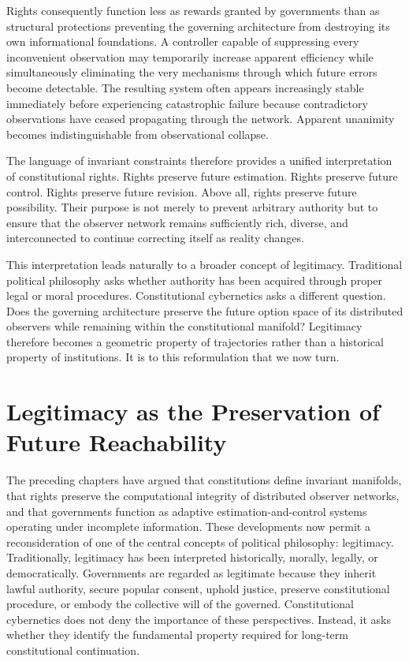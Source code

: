 \documentclass[12pt,a4paper]{article}
\begin{document}
Rights consequently function less as rewards granted by governments than as structural protections preventing the governing architecture from destroying its own informational foundations. A controller capable of suppressing every inconvenient observation may temporarily increase apparent efficiency while simultaneously eliminating the very mechanisms through which future errors become detectable. The resulting system often appears increasingly stable immediately before experiencing catastrophic failure because contradictory observations have ceased propagating through the network. Apparent unanimity becomes indistinguishable from observational collapse.

The language of invariant constraints therefore provides a unified interpretation of constitutional rights. Rights preserve future estimation. Rights preserve future control. Rights preserve future revision. Above all, rights preserve future possibility. Their purpose is not merely to prevent arbitrary authority but to ensure that the observer network remains sufficiently rich, diverse, and interconnected to continue correcting itself as reality changes.

This interpretation leads naturally to a broader concept of legitimacy. Traditional political philosophy asks whether authority has been acquired through proper legal or moral procedures. Constitutional cybernetics asks a different question. Does the governing architecture preserve the future option space of its distributed observers while remaining within the constitutional manifold? Legitimacy therefore becomes a geometric property of trajectories rather than a historical property of institutions. It is to this reformulation that we now turn.

\section{Legitimacy as the Preservation of Future Reachability}

The preceding chapters have argued that constitutions define invariant manifolds, that rights preserve the computational integrity of distributed observer networks, and that governments function as adaptive estimation-and-control systems operating under incomplete information. These developments now permit a reconsideration of one of the central concepts of political philosophy: legitimacy. Traditionally, legitimacy has been interpreted historically, morally, legally, or democratically. Governments are regarded as legitimate because they inherit lawful authority, secure popular consent, uphold justice, preserve constitutional procedure, or embody the collective will of the governed. Constitutional cybernetics does not deny the importance of these perspectives. Instead, it asks whether they identify the fundamental property required for long-term constitutional continuation.
\end{document}
